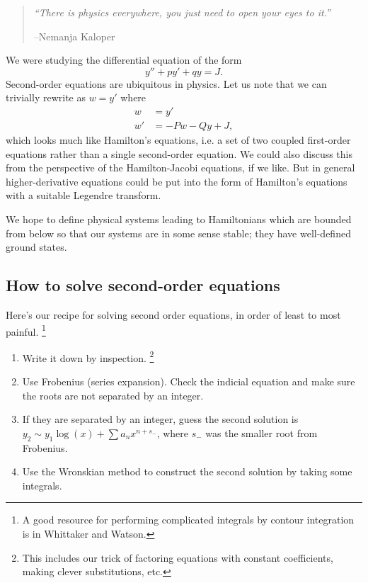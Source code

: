 \begin{quote}
    \textit{``There is physics everywhere, you just need to open your eyes to it.''}
    
    --Nemanja Kaloper
\end{quote}
We were studying the differential equation of the form
\begin{equation}
    y'' + py' + qy = J.
\end{equation}
Second-order equations are ubiquitous in physics. Let us note that we can trivially rewrite as $w=y'$ where
\begin{align}
    w &= y'\\
    w' &= -Pw - Q y + J,
\end{align}
which looks much like Hamilton's equations, i.e. a set of two coupled first-order equations rather than a single second-order equation. We could also discuss this from the perspective of the Hamilton-Jacobi equations, if we like. But in general higher-derivative equations could be put into the form of Hamilton's equations with a suitable Legendre transform.

We hope to define physical systems leading to Hamiltonians which are bounded from below so that our systems are in some sense stable; they have well-defined ground states.

\subsection*{How to solve second-order equations}
Here's our recipe for solving second order equations, in order of least to most painful.%
    \footnote{A good resource for performing complicated integrals by contour integration is in Whittaker and Watson.}
\begin{enumerate}
    \item Write it down by inspection.%
        \footnote{This includes our trick of factoring equations with constant coefficients, making clever substitutions, etc.}
    \item Use Frobenius (series expansion). Check the indicial equation and make sure the roots are not separated by an integer.
    \item If they are separated by an integer, guess the second solution is $y_2\sim y_1 \log(x) + \sum a_n x^{n+s_-}$, where $s_-$ was the smaller root from Frobenius.
    \item Use the Wronskian method to construct the second solution by taking some integrals.
\end{enumerate}

